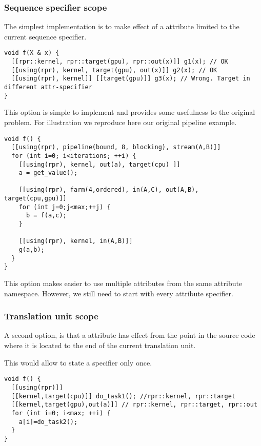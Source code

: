 \subsubsection{Sequence specifier scope}

The simplest implementation is to make effect of a  attribute
limited to the current sequence specifier.

\begin{lstlisting}
void f(X & x) {
  [[rpr::kernel, rpr::target(gpu), rpr::out(x)]] g1(x); // OK
  [[using(rpr), kernel, target(gpu), out(x)]] g2(x); // OK
  [[using(rpr), kernel]] [[target(gpu)]] g3(x); // Wrong. Target in different attr-specifier
}
\end{lstlisting}

This option is simple to implement and provides some usefulness to the original
problem. For illustration we reproduce here our original pipeline example.

\begin{lstlisting}
void f() {
  [[using(rpr), pipeline(bound, 8, blocking), stream(A,B)]]
  for (int i=0; i<iterations; ++i) {
    [[using(rpr), kernel, out(a), target(cpu) ]]
    a = get_value();
    
    [[using(rpr), farm(4,ordered), in(A,C), out(A,B), target(cpu,gpu)]]
    for (int j=0;j<max;++j) {
      b = f(a,c);
    }

    [[using(rpr), kernel, in(A,B)]]
    g(a,b);
  }
}
\end{lstlisting}

This option makes easier to use multiple attributes from the same attribute
namespace. However, we still need to start with  every attribute
specifier.

\subsubsection{Translation unit scope}

A second option, is that a  attribute has effect from the point
in the source code where it is located to the end of the current translation unit.

This would allow to state a  specifier only once.

\begin{lstlisting}
void f() {
  [[using(rpr)]]
  [[kernel,target(cpu)]] do_task1(); //rpr::kernel, rpr::target
  [[kernel,target(gpu),out(a)]] // rpr::kernel, rpr::target, rpr::out 
  for (int i=0; i<max; ++i) {
    a[i]=do_task2();
  }
}
\end{lstlisting}

